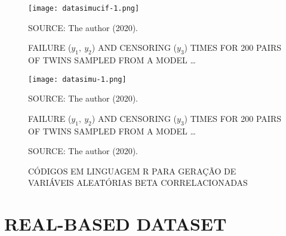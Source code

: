 \begin{figure}[H]
  \setlength{\abovecaptionskip}{.0001pt}
  \caption{FAILURE (\(y_{1},~y_{2}\)) AND CENSORING (\(y_{3}\)) TIMES
    FOR 200 PAIRS OF TWINS SAMPLED FROM A MODEL \dots}
  \vspace{0.425cm} \centering
  \texttt{[image: datasimucif-1.png]}
  \\
  \vspace{0.45cm}
  \begin{footnotesize}
    SOURCE: The author (2020).
  \end{footnotesize}
  \label{fig:datasimucif}
\end{figure}

\begin{figure}[H]
  \setlength{\abovecaptionskip}{.0001pt}
  \caption{FAILURE (\(y_{1},~y_{2}\)) AND CENSORING (\(y_{3}\)) TIMES
    FOR 200 PAIRS OF TWINS SAMPLED FROM A MODEL \dots}
  \vspace{0.2cm} \centering
  \texttt{[image: datasimu-1.png]}
  \\
  \vspace{0.2cm}
  \begin{footnotesize}
    SOURCE: The author (2020).
  \end{footnotesize}
  \label{fig:datasimu}
\end{figure}

\begin{figure}[H]
  \vspace{0.35cm}
  \setlength{\abovecaptionskip}{.00001pt}
  \caption{CÓDIGOS EM LINGUAGEM R PARA GERAÇÃO DE VARIÁVEIS ALEATÓRIAS
    BETA CORRELACIONADAS}
  \vspace{-0.25cm}
  \begin{program}[H]
  \end{program}
  \begin{footnotesize}
    \begin{center}
      SOURCE: The author (2020).
    \end{center}
  \end{footnotesize}
  \label{fig:steps1e2}
\end{figure}

\section{REAL-BASED DATASET}
\label{cap:data}

